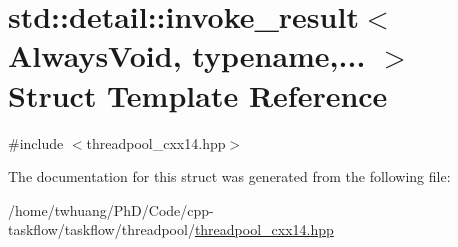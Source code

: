 \hypertarget{structstd_1_1detail_1_1invoke__result}{}\section{std\+:\+:detail\+:\+:invoke\+\_\+result$<$ Always\+Void, typename,... $>$ Struct Template Reference}
\label{structstd_1_1detail_1_1invoke__result}


{\ttfamily \#include $<$threadpool\+\_\+cxx14.\+hpp$>$}



The documentation for this struct was generated from the following file\+:\begin{DoxyCompactItemize}
\item 
/home/twhuang/\+Ph\+D/\+Code/cpp-\/taskflow/taskflow/threadpool/\hyperlink{threadpool__cxx14_8hpp}{threadpool\+\_\+cxx14.\+hpp}\end{DoxyCompactItemize}
